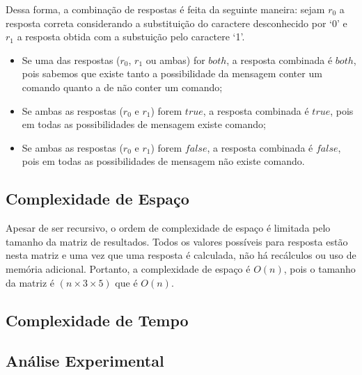 \documentclass[a4paper,12pt,titlepage]{article}
\begin{document}
Dessa forma, a combinação de respostas é feita da seguinte maneira: sejam $r_0$ a resposta correta considerando a substituição do caractere desconhecido por `0' e $r_1$ a resposta obtida com a substuição pelo caractere `1'.

\begin{itemize}[leftmargin=1.6cm]
    \item Se uma das respostas ($r_0$, $r_1$ ou ambas) for $both$, a resposta combinada é $both$, pois sabemos que existe tanto a possibilidade da mensagem conter um comando quanto a de não conter um comando;
    \item Se ambas as respostas ($r_0$ e $r_1$) forem $true$, a resposta combinada é $true$, pois em todas as possibilidades de mensagem existe comando;
    \item Se ambas as respostas ($r_0$ e $r_1$) forem $false$, a resposta combinada é $false$, pois em todas as possibilidades de mensagem não existe comando.
    \ \\
\end{itemize}


\subsection{Complexidade de Espaço}

Apesar de ser recursivo, o ordem de complexidade de espaço é limitada pelo tamanho da matriz de resultados. Todos os valores possíveis para resposta estão nesta matriz e uma vez que uma resposta é calculada, não há recálculos ou uso de memória adicional. Portanto, a complexidade de espaço é $O(n)$, pois o tamanho da matriz é $(n \times 3 \times 5)$ que é $O(n)$.


\subsection{Complexidade de Tempo}
\subsection{Análise Experimental}
\end{document}
